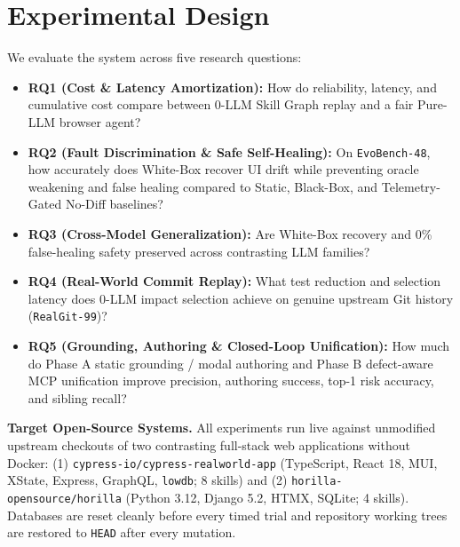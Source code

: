 \documentclass[conference]{IEEEtran}
\begin{document}
\section{Experimental Design}
We evaluate the system across five research questions:
\begin{itemize}
  \item \textbf{RQ1 (Cost \& Latency Amortization):} How do reliability, latency, and cumulative cost compare between 0-LLM Skill Graph replay and a fair Pure-LLM browser agent?
  \item \textbf{RQ2 (Fault Discrimination \& Safe Self-Healing):} On \texttt{EvoBench-48}, how accurately does White-Box recover UI drift while preventing oracle weakening and false healing compared to Static, Black-Box, and Telemetry-Gated No-Diff baselines?
  \item \textbf{RQ3 (Cross-Model Generalization):} Are White-Box recovery and 0\% false-healing safety preserved across contrasting LLM families?
  \item \textbf{RQ4 (Real-World Commit Replay):} What test reduction and selection latency does 0-LLM impact selection achieve on genuine upstream Git history (\texttt{RealGit-99})?
  \item \textbf{RQ5 (Grounding, Authoring \& Closed-Loop Unification):} How much do Phase A static grounding / modal authoring and Phase B defect-aware MCP unification improve precision, authoring success, top-1 risk accuracy, and sibling recall?
\end{itemize}

\textbf{Target Open-Source Systems.} All experiments run live against unmodified upstream checkouts of two contrasting full-stack web applications without Docker: (1) \texttt{cypress-io/cypress-realworld-app} (TypeScript, React 18, MUI, XState, Express, GraphQL, \texttt{lowdb}; 8 skills) and (2) \texttt{horilla-opensource/horilla} (Python 3.12, Django 5.2, HTMX, SQLite; 4 skills). Databases are reset cleanly before every timed trial and repository working trees are restored to \texttt{HEAD} after every mutation.
\end{document}
